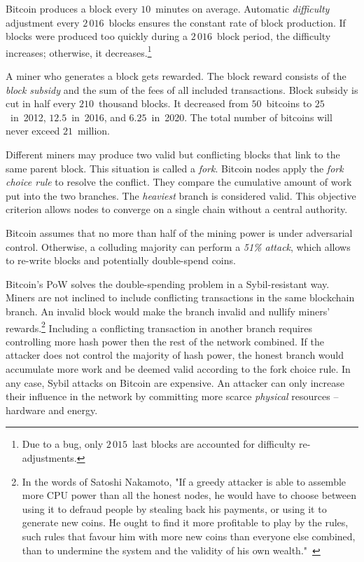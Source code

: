 Bitcoin produces a block every $10$~minutes on average.
Automatic \textit{difficulty} adjustment every  $2\,016$~blocks ensures the constant rate of block production.
If blocks were produced too quickly during a $2\,016$~block period, the difficulty increases; otherwise, it decreases.\footnote{Due to a bug, only $2\,015$~last blocks are accounted for difficulty re-adjustments.}

A miner who generates a block gets rewarded.
The block reward consists of the \textit{block subsidy} and the sum of the fees of all included transactions.
Block subsidy is cut in half every $210$~thousand blocks.
It decreased from $50$~bitcoins to $25$~in~2012, $12.5$~in~2016, and $6.25$~in~2020.
The total number of bitcoins will never exceed $21$~million.

Different miners may produce two valid but conflicting blocks that link to the same parent block.
This situation is called a \textit{fork}.
Bitcoin nodes apply the \textit{fork choice rule} to resolve the conflict.
They compare the cumulative amount of work put into the two branches.
The \textit{heaviest} branch is considered valid.
This objective criterion allows nodes to converge on a single chain without a central authority.

Bitcoin assumes that no more than half of the mining power is under adversarial control.
Otherwise, a colluding majority can perform a \textit{51\% attack}, which allows to re-write blocks and potentially double-spend coins.

Bitcoin's PoW solves the double-spending problem in a Sybil-resistant way.
Miners are not inclined to include conflicting transactions in the same blockchain branch.
An invalid block would make the branch invalid and nullify miners' rewards.\footnote{In the words of Satoshi Nakamoto, "If a greedy attacker is able to assemble more CPU power than all the honest nodes, he would have to choose between using it to defraud people by stealing back his payments, or using it to generate new coins. He ought to find it more profitable to play by the rules, such rules that favour him with more new coins than everyone else combined, than to undermine the system and the validity of his own wealth."~\cite{nakamoto2008bitcoin}}
Including a conflicting transaction in another branch requires controlling more hash power then the rest of the network combined.
If the attacker does not control the majority of hash power, the honest branch would accumulate more work and be deemed valid according to the fork choice rule.
In any case, Sybil attacks on Bitcoin are expensive.
An attacker can only increase their influence in the network by committing more scarce \textit{physical} resources -- hardware and energy.

